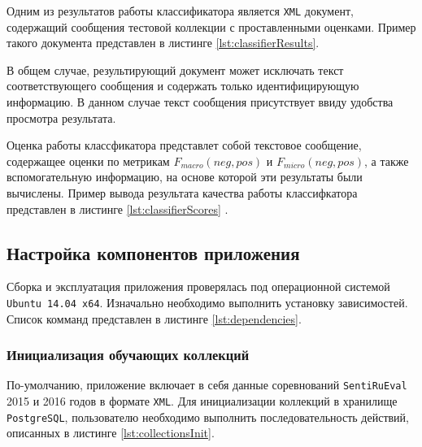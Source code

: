     Одним из результатов работы классификатора является {\tt XML} документ,
    содержащий сообщения тестовой коллекции с проставленными оценками.
    Пример такого документа представлен в листинге \ref{lst:classifierResults}.
    \lstset{style=xml}
    

    В общем случае, результирующий документ
    может исключать текст соответствующего сообщения и содержать только
    идентифицирующую информацию. В данном случае текст сообщения присутствует
    ввиду удобства просмотра результата.

    Оценка работы классфикатора представлет собой текстовое сообщение,
    содержащее оценки по метрикам  $F_{macro}(neg, pos)$ и $F_{micro}(neg, pos)$,
    а также вспомогательную информацию, на основе которой эти результаты были
    вычислены. Пример вывода результата качества работы классифкатора представлен
    в листинге \ref{lst:classifierScores} .
    \lstset{style=xml}
    

    \subsection{Настройка компонентов приложения}
    Сборка и эксплуатация приложения проверялась под операционной системой
    {\tt Ubuntu 14.04 x64}. Изначально необходимо выполнить установку зависимостей.
    Список комманд представлен в листинге \ref{lst:dependencies}.
    \lstset{style=bash}
    

        \subsubsection{Инициализация обучающих коллекций}
        По-умолчанию, приложение включает в себя данные соревнований {\tt SentiRuEval}
        2015 и 2016 годов в формате {\tt XML}. Для инициализации коллекций в хранилище
        {\tt PostgreSQL}, пользователю необходимо выполнить последовательность
        действий, описанных в листинге \ref{lst:collectionsInit}.
        \lstset{style=bash}
        

